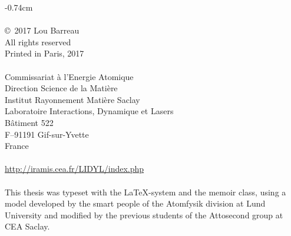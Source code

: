 \thispagestyle{empty}

\clearpage

\thispagestyle{empty}
\begin{narrow}{-0.7\marginwidth}{4cm}
    \vspace*{\fill}
    \footnotesize
    \noindent \textsc{\thesistitle}\\
    \vspace*{0.1cm}\\
    \noindent \copyright~2017 Lou Barreau\\
    \noindent All rights reserved\\
    \noindent Printed in Paris, 2017\\
    \vspace*{0.1cm}\\
    \noindent Commissariat à l'Energie Atomique\\
    \noindent Direction Science de la Mati\`ere\\
    \noindent Institut Rayonnement Mati\`ere Saclay\\
    \noindent Laboratoire Interactions, Dynamique et Lasers\\
    \noindent B\^atiment 522\\
    \noindent F--91191 Gif-sur-Yvette\\
    \noindent France\\
    \vspace*{-0.2cm}\\
    \noindent \url{http://iramis.cea.fr/LIDYL/index.php}\\
    \vspace*{0.1cm}\\
    \noindent This thesis was typeset with the \LaTeX -system and the memoir class, using a model developed by the smart people of the Atomfysik division at Lund University and modified by the previous students of the Attosecond group at CEA Saclay.
\end{narrow}

